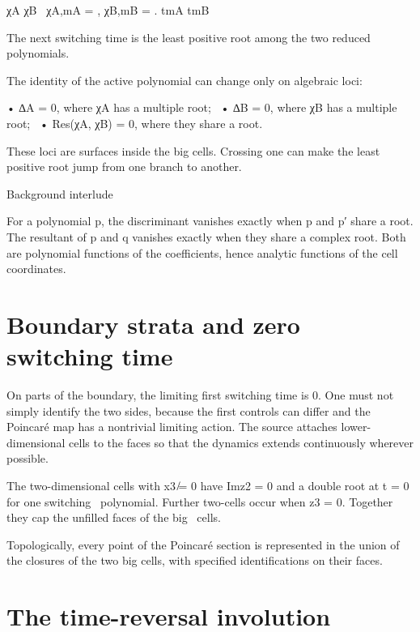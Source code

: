 \begin{displaytext}
χA χB \
χA,mA = , χB,mB = . tmA tmB
\end{displaytext}

The next switching time is the least positive root among the two reduced polynomials.


The identity of the active polynomial can change only on algebraic loci:


\begin{displaytext}
• ∆A = 0, where χA has a multiple root; \
• ∆B = 0, where χB has a multiple root; \
• Res(χA, χB) = 0, where they share a root.
\end{displaytext}

These loci are surfaces inside the big cells. Crossing one can make the least positive root jump from one branch to another.


Background interlude


For a polynomial p, the discriminant vanishes exactly when p and p′ share a root. The resultant of p and q vanishes exactly when they share a complex root. Both are polynomial functions of the coefficients, hence analytic functions of the cell coordinates.


\section{Boundary strata and zero switching time}

On parts of the boundary, the limiting first switching time is 0. One must not simply identify the two sides, because the first controls can differ and the Poincaré map has a nontrivial limiting action. The source attaches lower-dimensional cells to the faces so that the dynamics extends continuously wherever possible.


\begin{displaytext}
The two-dimensional cells with x3 ̸= 0 have Imz2 = 0 and a double root at t = 0 for one switching \
polynomial. Further two-cells occur when z3 = 0. Together they cap the unfilled faces of the big \
cells.
\end{displaytext}

Topologically, every point of the Poincaré section is represented in the union of the closures of the two big cells, with specified identifications on their faces.


\section{The time-reversal involution}

